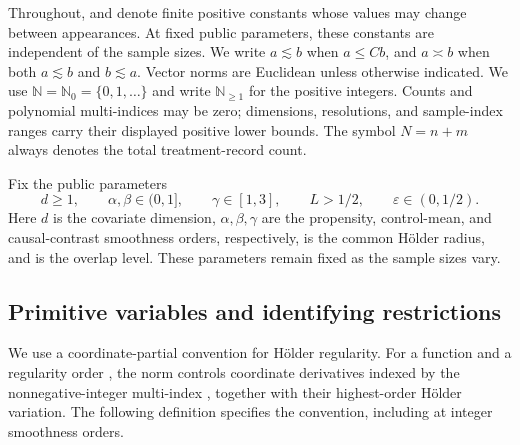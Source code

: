 \documentclass[11pt]{article}
\begin{document}
Throughout,  and  denote finite positive constants whose values may change between appearances. At fixed public parameters, these constants are independent of the sample sizes. We write \(a\lesssim b\) when \(a\le Cb\), and \(a\asymp b\) when both \(a\lesssim b\) and \(b\lesssim a\). Vector norms are Euclidean unless otherwise indicated. We use \(\mathbb N=\mathbb N_0=\{0,1,\ldots\}\) and write \(\mathbb N_{\ge1}\) for the positive integers. Counts and polynomial multi-indices may be zero; dimensions, resolutions, and sample-index ranges carry their displayed positive lower bounds. The symbol \(N=n+m\) always denotes the total treatment-record count.

Fix the public parameters
\[
d\ge1,\qquad
\alpha,\beta\in(0,1],\qquad
\gamma\in[1,3],\qquad
L>1/2,\qquad
\varepsilon\in(0,1/2).
\]
Here \(d\) is the covariate dimension, \(\alpha,\beta,\gamma\) are the propensity, control-mean, and causal-contrast smoothness orders, respectively,  is the common Hölder radius, and  is the overlap level. These parameters remain fixed as the sample sizes vary.

\subsection{Primitive variables and identifying restrictions}

We use a coordinate-partial convention for Hölder regularity. For a function  and a regularity order , the norm  controls coordinate derivatives indexed by the nonnegative-integer multi-index , together with their highest-order Hölder variation. The following definition specifies the convention, including at integer smoothness orders.
\end{document}
